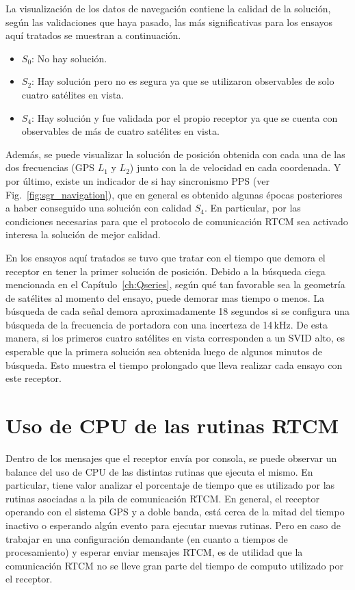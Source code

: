 \documentclass[a4paper,12pt,oneside,onecolumn,final,openright]{book}%
\begin{document}
	La visualización de los datos de navegación contiene la calidad de la solución, según las validaciones que haya pasado, las más significativas para los ensayos aquí tratados se muestran a continuación.
\begin{itemize}
	\item $S_0$: No hay solución.
	\item $S_2$: Hay solución pero no es segura ya que se utilizaron observables de solo cuatro satélites en vista.
	\item $S_4$: Hay solución y fue validada por el propio receptor ya que se cuenta con observables de más de cuatro satélites en vista.
\end{itemize}
	Además, se puede visualizar la solución de posición obtenida con cada una de las dos frecuencias (GPS $L_1$ y $L_2$) junto con la de velocidad en cada coordenada. Y por último, existe un indicador de si hay sincronismo PPS (ver Fig.~\ref{fig:sgr_navigation}), que en general es obtenido algunas épocas posteriores a haber conseguido una solución con calidad $S_4$. En particular, por las condiciones necesarias para que el protocolo de comunicación RTCM sea activado interesa la solución de mejor calidad.
	 
	En los ensayos aquí tratados se tuvo que tratar con el tiempo que demora el receptor en tener la primer solución de posición. Debido a la búsqueda ciega mencionada en el Capítulo~\ref{ch:Qseries}, según qué tan favorable sea la geometría de satélites al momento del ensayo, puede demorar mas tiempo o menos. La búsqueda de cada señal demora aproximadamente 18 segundos si se configura una búsqueda de la frecuencia de portadora con una incerteza de 14\,kHz. De esta manera, si los primeros cuatro satélites en vista corresponden a un SVID alto, es esperable que la primera solución sea obtenida luego de algunos minutos de búsqueda. Esto muestra el tiempo prolongado que lleva realizar cada ensayo con este receptor.

\section{Uso de CPU de las rutinas RTCM}
	Dentro de los mensajes que el receptor envía por consola, se puede observar un balance del uso de CPU de las distintas rutinas que ejecuta el mismo. En particular, tiene valor analizar el porcentaje de tiempo que es utilizado por las rutinas asociadas a la pila de comunicación RTCM. En general, el receptor operando con el sistema GPS y a doble banda, está cerca de la mitad del tiempo inactivo o esperando algún evento para ejecutar nuevas rutinas. Pero en caso de trabajar en una configuración demandante (en cuanto a tiempos de procesamiento) y esperar enviar mensajes RTCM, es de utilidad que la comunicación RTCM no se lleve gran parte del tiempo de computo utilizado por el receptor. 
\end{document}
